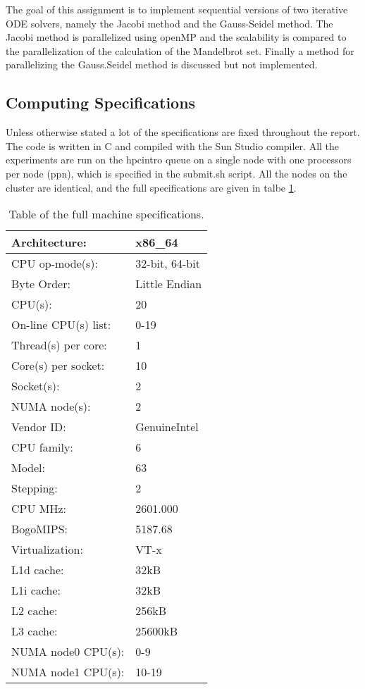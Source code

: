 The goal of this assignment is to implement sequential versions of two iterative ODE solvers, namely the Jacobi method and the Gauss-Seidel method. The Jacobi method is parallelized using openMP and the scalability is compared to the parallelization of the calculation of the Mandelbrot set. Finally a method for parallelizing the Gauss.Seidel method is discussed but not implemented.

\subsection{Computing Specifications}
Unless otherwise stated a lot of the specifications are fixed throughout the report. The code is written in C and compiled with the Sun Studio compiler. All the experiments are run on the hpcintro queue on a single node with one processors per node (ppn), which is specified in the submit.sh script. All the nodes on the cluster are identical, and the full specifications are given in talbe \ref{tab:spec}.
\begin{table}
\centering
\begin{tabular}{l l}
Architecture:     &     x86\_64 \\ \hline
CPU op-mode(s):    &    32-bit, 64-bit\\ \hline
Byte Order:         &   Little Endian\\ \hline
CPU(s):             &   20\\ \hline
On-line CPU(s) list:&   0-19\\ \hline
Thread(s) per core: &   1\\ \hline
Core(s) per socket: &   10\\ \hline
Socket(s):          &   2\\ \hline
NUMA node(s):       &   2\\ \hline
Vendor ID:          &   GenuineIntel\\ \hline
CPU family:         &   6\\ \hline
Model:              &   63\\ \hline
Stepping:           &   2\\ \hline
CPU MHz:            &   2601.000\\ \hline
BogoMIPS:           &   5187.68\\ \hline
Virtualization:     &   VT-x\\ \hline
L1d cache:          &   32kB\\ \hline
L1i cache:          &   32kB\\ \hline
L2 cache:           &   256kB\\ \hline
L3 cache:           &   25600kB\\ \hline
NUMA node0 CPU(s):  &   0-9\\ \hline
NUMA node1 CPU(s):  &   10-19\\
\end{tabular}
\caption{Table of the full machine specifications.}
\label{tab:spec}
\end{table}
